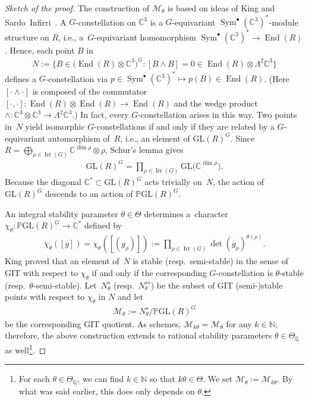 \documentclass[10pt,a4paper]{amsart}
\numberwithin{equation}{section}
\newcommand{\sM}{\mathscr{M}}
\newcommand{\N}{{\mathbb N}}
\newcommand{\Q}{{\mathbb Q}}
\newcommand{\C}{{\mathbb C}}
\newcommand{\GL}{\mathrm{GL}}
\newcommand{\PGL}{{\mathbb P}\GL}
\newcommand{\Irr}{\operatorname{Irr}}
\newcommand{\End}{\operatorname{End}}
\newcommand{\Sym}{\operatorname{Sym}}
\begin{document}
\begin{proof}[Sketch of the proof]
  The construction of $\sM_\theta$ is based on ideas of King
  \cite{King1994} and Sardo~In\-f\/irri~\cite{SardoInfirri1996}.  A
  $G$-constellation on $\C^3$ is a $G$-equivariant
  $\Sym^\bullet(\C^3)^*$-module structure on $R$, i.e., a~$G$-equivariant homomorphism $\Sym^\bullet(\C^3)^* \to \End(R)$.
  Hence, each point $B$ in
  \begin{gather}
    \label{eq:N}
    N := \big\{ B\in\big(\End(R)\otimes \C^3\big)^G \colon [B\wedge B]=0\in\End(R)\otimes\Lambda^2\C^3 \big\}
  \end{gather}
  def\/ines a $G$-constellation via $p \in
  \Sym^\bullet(\C^3)^* \mapsto p(B) \in \End(R)$.
  (Here $[\cdot \wedge \cdot]$ is composed of the commutator $[\cdot, \cdot]\colon \End(R)\otimes\End(R) \to \End(R)$ and the wedge product $\wedge\colon \C^3\otimes \C^3 \to \Lambda^2 \C^3$.)
  In fact, every
  $G$-constellation arises in this way.  Two points in~$N$ yield
  isomorphic $G$-constellations if and only if they are related by a
  $G$-equivariant automorphism of~$R$, i.e., an element of
  $\GL(R)^G$.  Since $R=\bigoplus_{\rho \in \Irr(G)} \C^{\dim\rho}
  \otimes \rho$, Schur's lemma gives
  \begin{gather*}
    \GL(R)^G=\prod_{\rho\in \Irr(G)} \GL\big(\C^{\dim\rho}\big).
  \end{gather*}
  Because the diagonal $\C^*\subset \GL(R)^G$ acts trivially on~$N$, the
  action of $\GL(R)^G$ descends to an action of $\PGL(R)^G$.

  An integral stability parameter $\theta\in\Theta$ determines a~character $\chi_\theta\colon \PGL(R)^G\to\C^*$ def\/ined by
  \begin{gather}\label{eq:chitheta}
    \chi_\theta([g])
      = \chi_\theta([(g_\rho)])
     := \prod_{\rho\in \Irr(G)} \det(g_\rho)^{\theta(\rho)}.
  \end{gather}
  King \cite[Proposition~3.1]{King1994} proved that an element of~$N$
  is stable (resp.~semi-stable) in the sense of GIT with respect to
  $\chi_\theta$ if and only if the corresponding $G$-constellation is
  $\theta$-stable (resp.\ $\theta$-semi-stable).  Let~$N^s_\theta$
  (resp.~$N^{ss}_\theta$) be the subset of GIT (semi-)stable points with
  respect to $\chi_\theta$ in $N$ and let
  \begin{gather*}%
    \sM_\theta:=N^s_\theta/\PGL(R)^G
  \end{gather*}
  be the corresponding GIT quotient.  As schemes,
  $\sM_{k\theta}=\sM_{\theta}$ for any $k \in \N$; therefore, the
  above construction extends to rational stability parameters
  $\theta\in\Theta_\Q$ as well\footnote{For
    each $\theta\in\Theta_\Q$, we can f\/ind $k \in \N$ so that $k\theta \in \Theta$.
    We set $\sM_{\theta} := \sM_{k\theta}$.
    By what was said earlier, this does only depends on $\theta$.}.


\end{proof}
\end{document}
